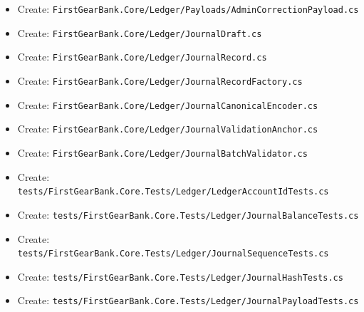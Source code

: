 \documentclass[
  10pt,
  letterpaper,
]{article}
\begin{document}
\begin{itemize}
\item
  Create:
  \texttt{FirstGearBank.}\allowbreak{}\texttt{Core/}\allowbreak{}\texttt{Ledger/}\allowbreak{}\texttt{Payloads/}\allowbreak{}\texttt{AdminCorrectionPayload.}\allowbreak{}\texttt{cs}
\item
  Create:
  \texttt{FirstGearBank.}\allowbreak{}\texttt{Core/}\allowbreak{}\texttt{Ledger/}\allowbreak{}\texttt{JournalDraft.}\allowbreak{}\texttt{cs}
\item
  Create:
  \texttt{FirstGearBank.}\allowbreak{}\texttt{Core/}\allowbreak{}\texttt{Ledger/}\allowbreak{}\texttt{JournalRecord.}\allowbreak{}\texttt{cs}
\item
  Create:
  \texttt{FirstGearBank.}\allowbreak{}\texttt{Core/}\allowbreak{}\texttt{Ledger/}\allowbreak{}\texttt{JournalRecordFactory.}\allowbreak{}\texttt{cs}
\item
  Create:
  \texttt{FirstGearBank.}\allowbreak{}\texttt{Core/}\allowbreak{}\texttt{Ledger/}\allowbreak{}\texttt{JournalCanonicalEncoder.}\allowbreak{}\texttt{cs}
\item
  Create:
  \texttt{FirstGearBank.}\allowbreak{}\texttt{Core/}\allowbreak{}\texttt{Ledger/}\allowbreak{}\texttt{JournalValidationAnchor.}\allowbreak{}\texttt{cs}
\item
  Create:
  \texttt{FirstGearBank.}\allowbreak{}\texttt{Core/}\allowbreak{}\texttt{Ledger/}\allowbreak{}\texttt{JournalBatchValidator.}\allowbreak{}\texttt{cs}
\item
  Create:
  \texttt{tests/}\allowbreak{}\texttt{FirstGearBank.}\allowbreak{}\texttt{Core.}\allowbreak{}\texttt{Tests/}\allowbreak{}\texttt{Ledger/}\allowbreak{}\texttt{LedgerAccountIdTests.}\allowbreak{}\texttt{cs}
\item
  Create:
  \texttt{tests/}\allowbreak{}\texttt{FirstGearBank.}\allowbreak{}\texttt{Core.}\allowbreak{}\texttt{Tests/}\allowbreak{}\texttt{Ledger/}\allowbreak{}\texttt{JournalBalanceTests.}\allowbreak{}\texttt{cs}
\item
  Create:
  \texttt{tests/}\allowbreak{}\texttt{FirstGearBank.}\allowbreak{}\texttt{Core.}\allowbreak{}\texttt{Tests/}\allowbreak{}\texttt{Ledger/}\allowbreak{}\texttt{JournalSequenceTests.}\allowbreak{}\texttt{cs}
\item
  Create:
  \texttt{tests/}\allowbreak{}\texttt{FirstGearBank.}\allowbreak{}\texttt{Core.}\allowbreak{}\texttt{Tests/}\allowbreak{}\texttt{Ledger/}\allowbreak{}\texttt{JournalHashTests.}\allowbreak{}\texttt{cs}
\item
  Create:
  \texttt{tests/}\allowbreak{}\texttt{FirstGearBank.}\allowbreak{}\texttt{Core.}\allowbreak{}\texttt{Tests/}\allowbreak{}\texttt{Ledger/}\allowbreak{}\texttt{JournalPayloadTests.}\allowbreak{}\texttt{cs}

\end{itemize}
\end{document}
